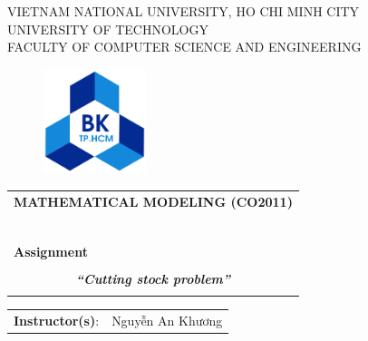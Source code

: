 \documentclass[a4paper]{article}
\begin{document}
    
    \begin{titlepage}
    \begin{center}
    VIETNAM NATIONAL UNIVERSITY, HO CHI MINH CITY \\
    UNIVERSITY OF TECHNOLOGY \\
    FACULTY OF COMPUTER SCIENCE AND ENGINEERING
    \end{center}
    
    \vspace{1cm}
    
    \begin{figure}[h!]
    \begin{center}
    \includegraphics[width=3cm]{Image/hcmut.png}
    \end{center}
    \end{figure}
    
    \vspace{1cm}
    
    
    \begin{center}
    \begin{tabular}{c}
    \multicolumn{1}{l}{\textbf{{\Large MATHEMATICAL MODELING (CO2011)}}}\\
    ~~\\
    \hline
    \\
    \multicolumn{1}{l}{\textbf{{\Large Assignment}}}\\
    \\
    \textbf{\textit{{\Huge “Cutting stock problem”}}}\\
    \\
    \hline
    \end{tabular}
    \end{center}
    
    \vspace{2cm}
    
    \begin{table}[h]
    \centering
        \begin{tabular}{rl}
        \hspace{3 cm}\textbf{Instructor(s)}:
        & Nguyễn An Khương\\


\end{tabular}
\end{table}
\end{titlepage}
\end{document}
